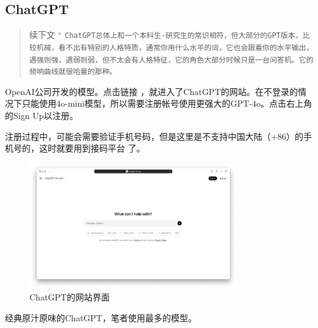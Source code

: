 \subsection{\textsf{ChatGPT}}

\begin{quote}{续下文}
    \Huge{“}
    \normalsize \texttt{ChatGPT总体上和一个本科生-研究生的常识相符，但大部分的GPT版本，比较机械，看不出有特别的人格特质，通常你用什么水平的词，它也会跟着你的水平输出，遇强则强，遇弱则弱，但不太会有人格特征，它的角色大部分时候只是一台问答机。它的频响曲线就很哈曼的那种。}
\end{quote}


\textsf{OpenAI}公司开发的模型。点击链接 \href{https://chatgpt.com}{\color{black}\faLink}，就进入了\textsf{ChatGPT}的网站。在不登录的情况下只能使用\textsf{4o-mini}模型，所以需要注册帐号使用更强大的\textsf{GPT-4o}。点击右上角的Sign Up以注册。

注册过程中，可能会需要验证手机号码，但是这里是不支持中国大陆（+86）的手机号的，这时就要用到接码平台 \hyperlink{sms-code}{}了。

\begin{figure}[H]
    \centering
    \includegraphics[width=0.8\textwidth]{pics/ChatGPT.png}
    \caption{\textsf{ChatGPT}的网站界面}
\end{figure}

经典原汁原味的\textsf{ChatGPT}，笔者使用最多的模型。

